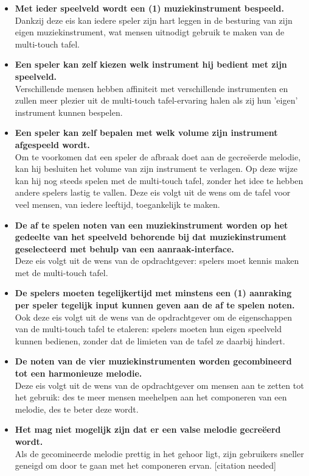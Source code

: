 \documentclass{acm}
\begin{document}
\begin{itemize}
	\item \textbf{Met ieder speelveld wordt een (1) muziekinstrument bespeeld.} \\ Dankzij deze eis kan iedere speler zijn hart leggen in de besturing van zijn eigen muziekinstrument, wat mensen uitnodigt gebruik te maken van de multi-touch tafel.
	\item \textbf{Een speler kan zelf kiezen welk instrument hij bedient met zijn speelveld.} \\ Verschillende mensen hebben affiniteit met verschillende instrumenten en zullen meer plezier uit de multi-touch tafel-ervaring halen als zij hun 'eigen' instrument kunnen bespelen.
	\item \textbf{Een speler kan zelf bepalen met welk volume zijn instrument afgespeeld wordt.} \\ Om te voorkomen dat een speler de afbraak doet aan de gecreëerde melodie, kan hij besluiten het volume van zijn instrument te verlagen. Op deze wijze kan hij nog steeds spelen met de multi-touch tafel, zonder het idee te hebben andere spelers lastig te vallen. Deze eis volgt uit de wens om de tafel voor veel mensen, van iedere leeftijd, toegankelijk te maken.
	\item \textbf{De af te spelen noten van een muziekinstrument worden op het gedeelte van het speelveld behorende bij dat muziekinstrument geselecteerd met behulp van een aanraak-interface.} \\ Deze eis volgt uit de wens van de opdrachtgever: spelers moet kennis maken met de multi-touch tafel.
	\item \textbf{De spelers moeten tegelijkertijd met minstens een (1) aanraking per speler tegelijk input kunnen geven aan de af te spelen noten.} \\ Ook deze eis volgt uit de wens van de opdrachtgever om de eigenschappen van de multi-touch tafel te etaleren: spelers moeten hun eigen speelveld kunnen bedienen, zonder dat de limieten van de tafel ze daarbij hindert.
	\item \textbf{De noten van de vier muziekinstrumenten worden gecombineerd tot een harmonieuze melodie.} \\ Deze eis volgt uit de wens van de opdrachtgever om mensen aan te zetten tot het gebruik: des te meer mensen meehelpen aan het componeren van een melodie, des te beter deze wordt.
	\item \textbf{Het mag niet mogelijk zijn dat er een valse melodie gecreëerd wordt.} \\ Als de gecomineerde melodie prettig in het gehoor ligt, zijn gebruikers sneller geneigd om door te gaan met het componeren ervan. [citation needed]

\end{itemize}
\end{document}
